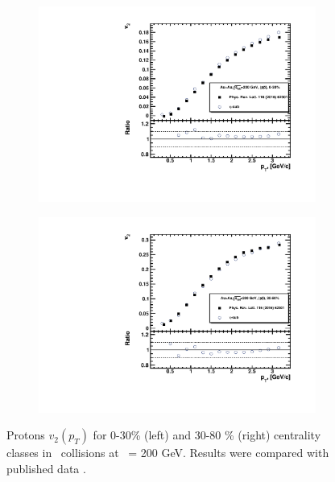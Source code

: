 \begin{figure}[ht]
    \begin{subfigure}{.49\textwidth}
        \centering
        \includegraphics[width=1.\linewidth]{Figures/v2_protons_pt_cent0.pdf}
    \end{subfigure}
    \begin{subfigure}{.49\textwidth}
        \centering
        \includegraphics[width=1.\linewidth]{Figures/v2_protons_pt_cent1.pdf}
    \end{subfigure}
    \label{fig:v2_EP_Protons}
    \caption{Protons $v_2(p_T)$ for 0-30\% (left) and 30-80 \% (right) centrality classes in \AuAu\ collisions at \sNN\ = 200 GeV. Results were compared with published data \cite{Adamczyk:2015ukd}.}
\end{figure}

